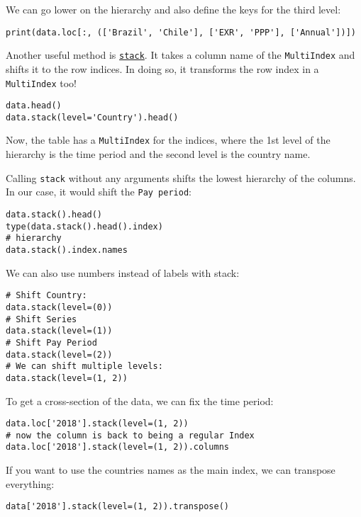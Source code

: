 \documentclass[12pt, a4paper]{article}
\begin{document}
We can go lower on the hierarchy and also define the keys for the third level:
\lstset{language=jupyter-python,label= ,caption= ,captionpos=b,numbers=none}
\begin{lstlisting}
print(data.loc[:, (['Brazil', 'Chile'], ['EXR', 'PPP'], ['Annual'])])
\end{lstlisting}

Another useful method is \href{https://pandas.pydata.org/pandas-docs/stable/reference/api/pandas.DataFrame.stack.html}{\texttt{stack}}.
It takes a column name of the \texttt{MultiIndex} and shifts it to the row indices.
In doing so, it transforms the row index in a \texttt{MultiIndex} too!
\lstset{language=jupyter-python,label= ,caption= ,captionpos=b,numbers=none}
\begin{lstlisting}
data.head()
data.stack(level='Country').head()
\end{lstlisting}
Now, the table has a \texttt{MultiIndex} for the indices, where the 1st level of the hierarchy is the time period and the second level is the country name.

Calling \texttt{stack} without any arguments shifts the lowest hierarchy of the columns.
In our case, it would shift the \texttt{Pay period}:
\lstset{language=jupyter-python,label= ,caption= ,captionpos=b,numbers=none}
\begin{lstlisting}
data.stack().head()
type(data.stack().head().index)
# hierarchy
data.stack().index.names
\end{lstlisting}
We can also use numbers instead of labels with stack:
\lstset{language=jupyter-python,label= ,caption= ,captionpos=b,numbers=none}
\begin{lstlisting}
# Shift Country:
data.stack(level=(0))
# Shift Series
data.stack(level=(1))
# Shift Pay Period
data.stack(level=(2))
# We can shift multiple levels:
data.stack(level=(1, 2))
\end{lstlisting}

To get a cross-section of the data, we can fix the time period:
\lstset{language=jupyter-python,label= ,caption= ,captionpos=b,numbers=none}
\begin{lstlisting}
data.loc['2018'].stack(level=(1, 2))
# now the column is back to being a regular Index
data.loc['2018'].stack(level=(1, 2)).columns
\end{lstlisting}

If you want to use the countries names as the main index, we can transpose everything:
\lstset{language=jupyter-python,label= ,caption= ,captionpos=b,numbers=none}
\begin{lstlisting}
data['2018'].stack(level=(1, 2)).transpose()
\end{lstlisting}
\end{document}
